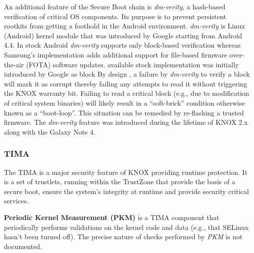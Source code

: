 \documentclass[11pt]{article}
\begin{document}
An additional feature of the Secure Boot chain is \emph{dm-verity}, a hash-based verification of critical OS components. 
Its purpose is to prevent persistent rootkits from getting a foothold in the Android environment. 
\emph{dm-verity} is Linux (Android) kernel module that was introduced by Google \cite{DmVerity} starting from Android 4.4.
In stock Android \emph{dm-verity} supports only block-based verification whereas Samsung's implementation adds
additional support for file-based firmware over-the-air (FOTA) software updates.
 available stock implementation was initially introduced by Google as block
By design \cite {SamsungCorrespondence}, a failure by \emph{dm-verity} to verify a block will mark it as corrupt thereby failing any attempts to read it 
without triggering the KNOX warranty bit. 
Failing to read a critical block (e.g., due to modification of critical system binaries) will likely result in a ``soft-brick'' condition
otherwise known as a ``boot-loop''. This situation can be remedied by re-flashing a trusted firmware.
The \emph{dm-verity} feature was introduced during the lifetime of KNOX 2.x along with the Galaxy Note 4.

\subsubsection{TIMA} \label{knox-tima}
The TIMA is a major security feature of KNOX providing runtime protection. It is a set of trustlets, running within the TrustZone that provide the basis of a secure boot, 
ensure the system's integrity at runtime and provide security critical services.

\textbf{Periodic Kernel Measurement (PKM)} is a TIMA component that periodically performs validations on the kernel code and data 
(e.g., that SELinux hasn't been turned off). The precise nature of checks performed by \emph{PKM} is not documented.
\end{document}
